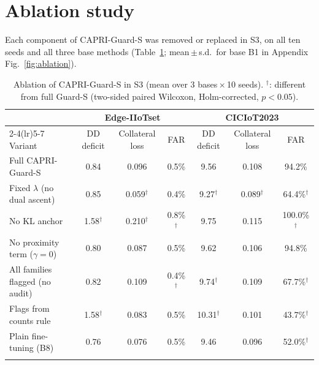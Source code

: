 \documentclass[pdflatex,sn-mathphys-num,iicol]{sn-jnl}
\begin{document}
\section{Ablation study}\label{sec:ablation}

Each component of CAPRI-Guard-S was removed or replaced in S3, on all ten seeds and all three base methods (Table~\ref{tab:ablation}; mean\,$\pm$\,s.d.\ for base B1 in Appendix Fig.~\ref{fig:ablation}).

\begin{table}[t]
\caption{Ablation of CAPRI-Guard-S in S3 (mean over 3 bases\,$\times$\,10 seeds). $^{\dagger}$: different from full Guard-S (two-sided paired Wilcoxon, Holm-corrected, $p<0.05$).}\label{tab:ablation}
\scriptsize
\setlength{\tabcolsep}{3pt}
\begin{tabular*}{\textwidth}{@{\extracolsep\fill}lcccccc}
\toprule
 & \multicolumn{3}{c}{Edge-IIoTset} & \multicolumn{3}{c}{CICIoT2023} \\
\cmidrule(lr){2-4}\cmidrule(lr){5-7}
Variant & DD deficit & Collateral loss & FAR & DD deficit & Collateral loss & FAR \\
\midrule
Full CAPRI-Guard-S & 0.84 & 0.096 & 0.5\% & 9.56 & 0.108 & 94.2\% \\
Fixed $\lambda$ (no dual ascent) & 0.85 & 0.059$^{\dagger}$ & 0.4\% & 9.27$^{\dagger}$ & 0.089$^{\dagger}$ & 64.4\%$^{\dagger}$ \\
No KL anchor & 1.58$^{\dagger}$ & 0.210$^{\dagger}$ & 0.8\%$^{\dagger}$ & 9.75 & 0.115 & 100.0\%$^{\dagger}$ \\
No proximity term ($\gamma=0$) & 0.80 & 0.087 & 0.5\% & 9.62 & 0.106 & 94.8\% \\
All families flagged (no audit) & 0.82 & 0.109 & 0.4\%$^{\dagger}$ & 9.74$^{\dagger}$ & 0.109 & 67.7\%$^{\dagger}$ \\
Flags from counts rule & 1.58$^{\dagger}$ & 0.083 & 0.5\% & 10.31$^{\dagger}$ & 0.101 & 43.7\%$^{\dagger}$ \\
Plain fine-tuning (B8) & 0.76 & 0.076 & 0.5\% & 9.46 & 0.096 & 52.0\%$^{\dagger}$ \\
\botrule
\end{tabular*}
\end{table}
\end{document}
